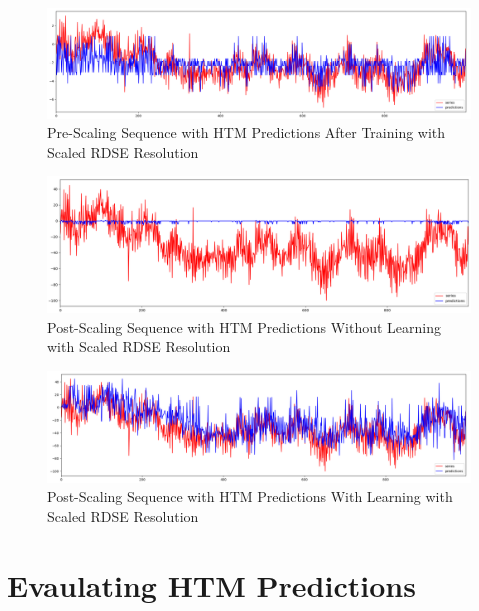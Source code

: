 \documentclass[oneside,12pt,openany]{book}
\begin{document}
    
     \begin{figure}[hbt!]
        \centering
        \includegraphics[width=\linewidth]{images/NoScaling.png}
        \caption{Pre-Scaling Sequence with HTM Predictions After Training with Scaled RDSE Resolution}
        \label{fig:gennoscalechange}
    \end{figure}
    \begin{figure}[hbt!]
        \centering
        \includegraphics[width=\linewidth]{images/Scaling-NoLearning.png}
        \caption{Post-Scaling Sequence with HTM Predictions Without Learning with Scaled RDSE Resolution}
        \label{fig:genscalenolearningchange}
    \end{figure}
    \begin{figure}[hbt!]
        \centering
        \includegraphics[width=\linewidth]{images/Scaling-Learning.png}
        \caption{Post-Scaling Sequence with HTM Predictions With Learning with Scaled RDSE Resolution}
        \label{fig:genscalelearningchange}
    \end{figure}
    \FloatBarrier
    
    
    
    
    
    \section{Evaulating HTM Predictions}\label{sec:res:eval}
    
\end{document}
